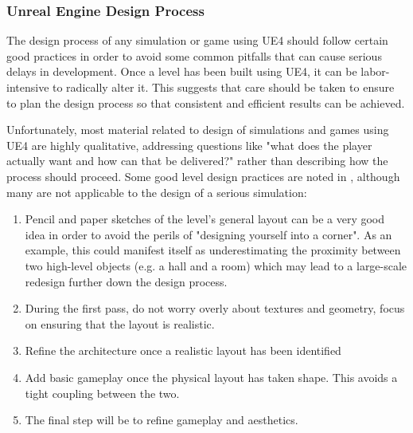 \subsubsection{Unreal Engine Design Process}
The design process of any simulation or game using UE4 should follow certain good practices in order to avoid some common pitfalls that can cause serious delays in development. Once a level has been built using UE4, it can be labor-intensive to radically alter it\cite[p.~454]{Rouse2005GamePractice}. This suggests that care should be taken to ensure to plan the design process so that consistent and efficient results can be achieved.

Unfortunately, most material related to design of simulations and games using UE4 are highly qualitative, addressing questions like "what does the player actually want and how can that be delivered?" rather than describing how the process should proceed. Some good level design practices are noted in \cite{Rouse2005GamePractice}, although many are not applicable to the design of a serious simulation:
\begin{enumerate}
    \item Pencil and paper sketches of the level's general layout can be a very good idea in order to avoid the perils of "designing yourself into a corner". As an example, this could manifest itself as underestimating the proximity between two high-level objects (e.g. a hall and a room) which may lead to a large-scale redesign further down the design process.
    \item During the first pass, do not worry overly about textures and geometry, focus on ensuring that the layout is realistic.
    \item Refine the architecture once a realistic layout has been identified
    \item Add basic gameplay once the physical layout has taken shape. This avoids a tight coupling between the two.
    \item The final step will be to refine gameplay and aesthetics.
\end{enumerate}

